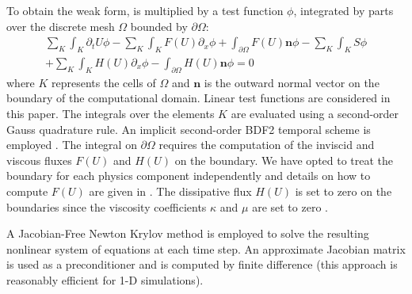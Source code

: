 \documentclass[times]{fldauth}
\begin{document}
%
 
To obtain the weak form,  is multiplied by a test function $\phi$, integrated by parts over the discrete mesh $\Omega$ bounded by $\partial \Omega$:
\begin{multline}
\sum_K \int_{K} \partial_t U \phi - \sum_K \int_{K} F(U) \partial_x \phi + \int_{\partial \Omega} F(U) \mathbf{n} \phi - 
 \sum_K \int_{K} S \phi \\
 + \sum_K \int_{K} H(U) \partial_x \phi - \int_{\partial \Omega}H \left( U \right) \mathbf{n} \phi= 0
\end{multline}
where $K$ represents the cells of $\Omega$ and $\mathbf{n}$ is the outward normal vector on the boundary of the computational domain. 
Linear test functions are considered in this paper. The integrals over the elements $K$ are evaluated using a second-order Gauss quadrature rule. 
An implicit second-order BDF2 temporal scheme is employed \cite{bdf2}  . 
The integral on $\partial \Omega$ requires the computation of the inviscid and viscous fluxes $F(U)$ and $H(U)$ on the boundary. 
We have opted to treat the boundary for each physics component independently and details on how to compute $F(U)$ are given in \cite{our_jcp_radhy_paper}. 
The dissipative flux $H(U)$ is set to zero on the boundaries since the viscosity coefficients $\kappa$ and $\mu$ are set to zero \cite{jlg1, jlg2, valentin}. 

A Jacobian-Free Newton Krylov method \cite{JFNK} is employed to solve the resulting nonlinear system of equations at each time step.
An approximate Jacobian matrix is used as a preconditioner and is computed by finite difference (this approach is reasonably efficient for 1-D simulations). 

%
\end{document}
